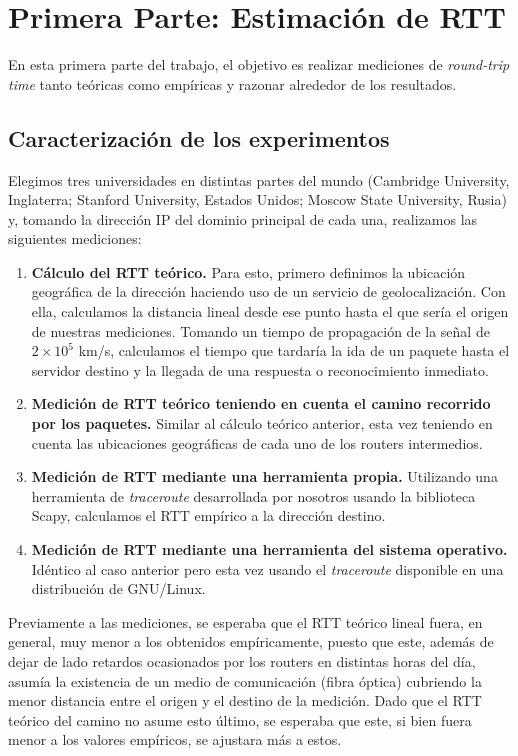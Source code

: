 \newpage

\section{Primera Parte: Estimación de RTT}
En esta primera parte del trabajo, el objetivo es realizar mediciones de
\emph{round-trip time} tanto teóricas como empíricas y razonar alrededor de
los resultados.

\subsection{Caracterización de los experimentos}

Elegimos tres universidades en distintas partes del mundo (Cambridge
University, Inglaterra; Stanford University, Estados Unidos; Moscow State
University, Rusia) y, tomando la dirección IP del dominio principal de cada
una, realizamos las siguientes mediciones:
\begin{enumerate}
    \item \textbf{Cálculo del RTT teórico.} Para esto, primero definimos la
        ubicación geográfica de la dirección haciendo uso de un servicio de
        geolocalización. Con ella, calculamos la distancia lineal desde ese
        punto hasta el que sería el origen de nuestras mediciones. Tomando un
        tiempo de propagación de la señal de $2 \times 10^5$ km/s, calculamos
        el tiempo que tardaría la ida de un paquete hasta el servidor destino
        y la llegada de una respuesta o reconocimiento inmediato.
    \item \textbf{Medición de RTT teórico teniendo en cuenta el camino
        recorrido por los paquetes.} Similar al cálculo teórico anterior, esta
        vez teniendo en cuenta las ubicaciones geográficas de cada uno de los
        routers intermedios.
    \item \textbf{Medición de RTT mediante una herramienta propia.} Utilizando
        una herramienta de \emph{traceroute} desarrollada por nosotros usando
        la biblioteca Scapy, calculamos el RTT empírico a la dirección
        destino.
    \item \textbf{Medición de RTT mediante una herramienta del sistema
        operativo.} Idéntico al caso anterior pero esta vez usando el
        \emph{traceroute} disponible en una distribución de GNU/Linux.
\end{enumerate}

Previamente a las mediciones, se esperaba que el RTT teórico lineal fuera, en
general, muy menor a los obtenidos empíricamente, puesto que este, además de
dejar de lado retardos ocasionados por los routers en distintas horas del día,
asumía la existencia de un medio de comunicación (fibra óptica) cubriendo la
menor distancia entre el origen y el destino de la medición. Dado que el RTT
teórico del camino no asume esto último, se esperaba que este, si bien fuera
menor a los valores empíricos, se ajustara más a estos.

